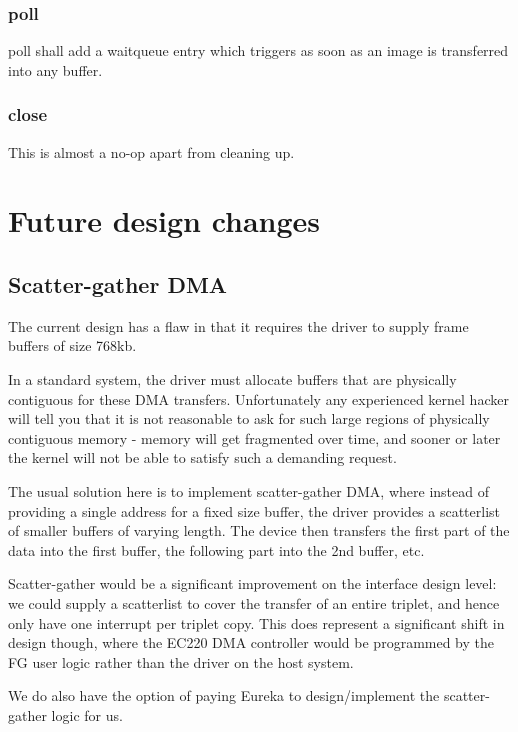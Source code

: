 \documentclass[12pt]{article}
\begin{document}
\subsubsection{poll}

poll shall add a waitqueue entry which triggers as soon as an image is transferred into any buffer.

\subsubsection{close}

This is almost a no-op apart from cleaning up.

\section{Future design changes}

\subsection{Scatter-gather DMA}

The current design has a flaw in that it requires the driver to supply frame buffers of size 768kb.

In a standard system, the driver must allocate buffers that are physically contiguous for these DMA transfers. Unfortunately any experienced kernel hacker will tell you that it is not reasonable to ask for such large regions of physically contiguous memory - memory will get fragmented over time, and sooner or later the kernel will not be able to satisfy such a demanding request.

The usual solution here is to implement scatter-gather DMA, where instead of providing a single address for a fixed size buffer, the driver provides a scatterlist of smaller buffers of varying length. The device then transfers the first part of the data into the first buffer, the following part into the 2nd buffer, etc.

Scatter-gather would be a significant improvement on the interface design level: we could supply a scatterlist to cover the transfer of an entire triplet, and hence only have one interrupt per triplet copy. This does represent a significant shift in design though, where the EC220 DMA controller would be programmed by the FG user logic rather than the driver on the host system.

We do also have the option of paying Eureka to design/implement the scatter-gather logic for us.
\end{document}
